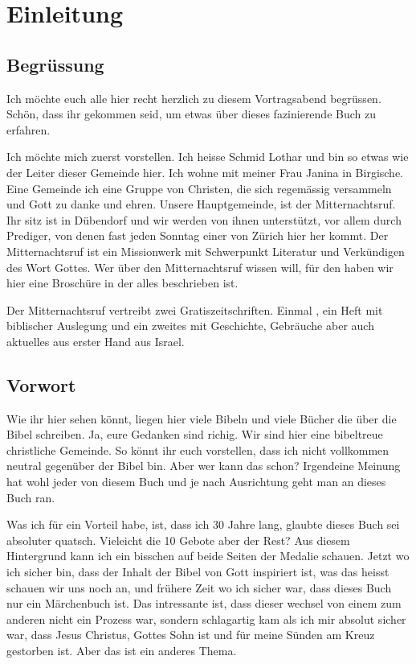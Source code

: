\section{Einleitung}
\subsection{Begrüssung}
Ich möchte euch alle hier recht herzlich zu diesem Vortragsabend begrüssen. Schön, dass ihr gekommen seid, um etwas über dieses fazinierende Buch zu erfahren.

Ich möchte mich zuerst vorstellen. Ich heisse Schmid Lothar und bin so etwas wie der Leiter dieser Gemeinde hier. Ich wohne mit meiner Frau Janina in Birgische. Eine Gemeinde ich eine Gruppe von Christen, die sich regemässig versammeln und Gott zu danke und ehren. Unsere Hauptgemeinde, ist der Mitternachtsruf. Ihr sitz ist in Dübendorf und wir werden von ihnen unterstützt, vor allem durch Prediger, von denen fast jeden Sonntag einer von Zürich hier her kommt. Der Mitternachtsruf ist ein Missionwerk mit Schwerpunkt Literatur und Verkündigen des Wort Gottes. Wer über den Mitternachtsruf wissen will, für den haben wir hier eine Broschüre in der alles beschrieben ist.

Der Mitternachtsruf vertreibt zwei Gratiszeitschriften. Einmal , ein Heft mit biblischer Auslegung und ein zweites  mit Geschichte, Gebräuche aber auch aktuelles aus erster Hand aus Israel.

\subsection{Vorwort}
Wie ihr hier sehen könnt, liegen hier viele Bibeln und viele Bücher die über die Bibel schreiben. Ja, eure Gedanken sind richig. Wir sind hier eine bibeltreue christliche Gemeinde. So könnt ihr euch vorstellen, dass ich nicht vollkommen neutral gegenüber der Bibel bin. Aber wer kann das schon? Irgendeine Meinung hat wohl jeder von diesem Buch und je nach Ausrichtung geht man an dieses Buch ran.

Was ich für ein Vorteil habe, ist, dass ich 30 Jahre lang, glaubte dieses Buch sei absoluter quatsch. Vieleicht die 10 Gebote aber der Rest? Aus diesem Hintergrund kann ich ein bisschen auf beide Seiten der Medalie schauen. Jetzt wo ich sicher bin, dass der Inhalt der Bibel von Gott inspiriert ist, was das heisst schauen wir uns noch an, und frühere Zeit wo ich sicher war, dass dieses Buch nur ein Märchenbuch ist. Das intressante ist, dass dieser wechsel von einem zum anderen nicht ein Prozess war, sondern schlagartig kam als ich mir absolut sicher war, dass Jesus Christus, Gottes Sohn ist und für meine Sünden am Kreuz gestorben ist. Aber das ist ein anderes Thema. 

